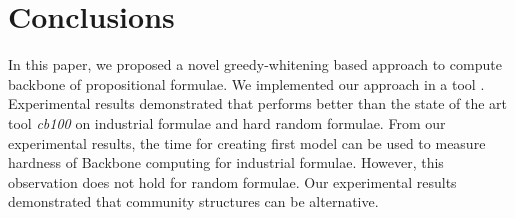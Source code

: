 \section{Conclusions}\label{sec:conc}



In this paper, we proposed a novel greedy-whitening based approach \tool to compute backbone of propositional formulae.
We implemented our approach in a tool \tool. Experimental results demonstrated that
\tool performs better than the state of the art tool \textit{cb100} on industrial formulae and hard random formulae.
From our experimental results, the time for creating first model can be used to measure hardness of Backbone computing for industrial formulae.
However, this observation does not hold for random formulae. Our experimental results demonstrated that community structures can be alternative.



